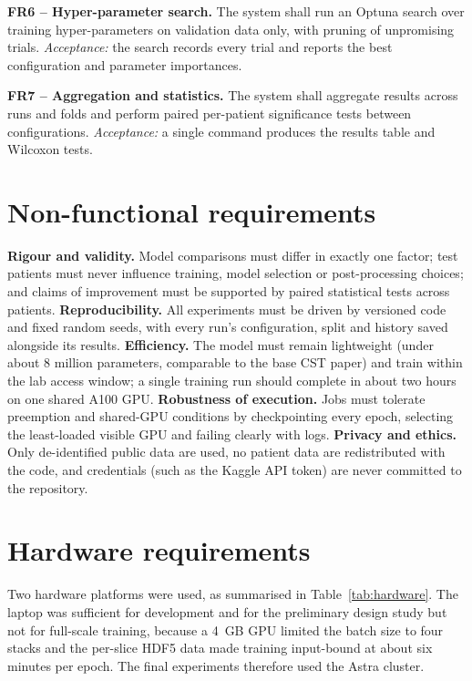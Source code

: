 \textbf{FR6 -- Hyper-parameter search.} The system shall run an Optuna search over training hyper-parameters on validation data only, with pruning of unpromising trials. \emph{Acceptance:} the search records every trial and reports the best configuration and parameter importances.

\textbf{FR7 -- Aggregation and statistics.} The system shall aggregate results across runs and folds and perform paired per-patient significance tests between configurations. \emph{Acceptance:} a single command produces the results table and Wilcoxon tests.

\section{Non-functional requirements}
\textbf{Rigour and validity.} Model comparisons must differ in exactly one factor; test patients must never influence training, model selection or post-processing choices; and claims of improvement must be supported by paired statistical tests across patients. \textbf{Reproducibility.} All experiments must be driven by versioned code and fixed random seeds, with every run's configuration, split and history saved alongside its results. \textbf{Efficiency.} The model must remain lightweight (under about 8 million parameters, comparable to the base CST paper) and train within the lab access window; a single training run should complete in about two hours on one shared A100 GPU. \textbf{Robustness of execution.} Jobs must tolerate preemption and shared-GPU conditions by checkpointing every epoch, selecting the least-loaded visible GPU and failing clearly with logs. \textbf{Privacy and ethics.} Only de-identified public data are used, no patient data are redistributed with the code, and credentials (such as the Kaggle API token) are never committed to the repository.

\section{Hardware requirements}
Two hardware platforms were used, as summarised in Table~\ref{tab:hardware}. The laptop was sufficient for development and for the preliminary design study but not for full-scale training, because a 4~GB GPU limited the batch size to four stacks and the per-slice HDF5 data made training input-bound at about six minutes per epoch. The final experiments therefore used the Astra cluster.


